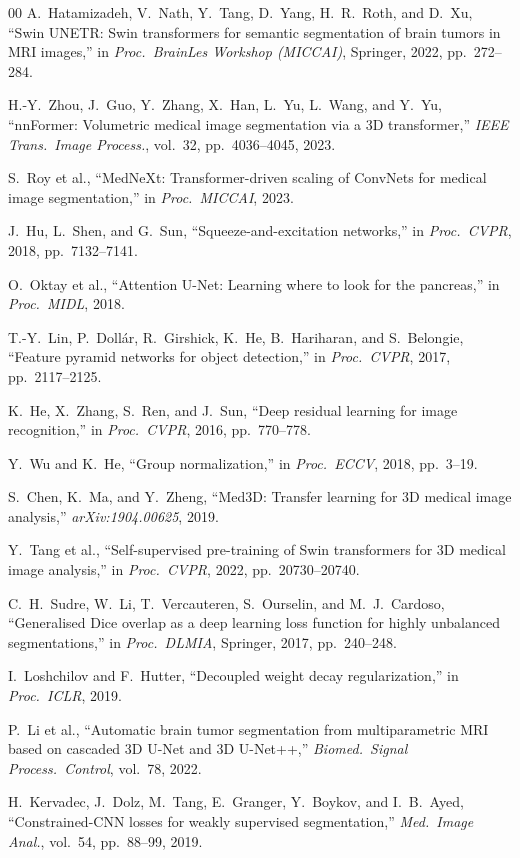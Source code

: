 \documentclass[conference]{IEEEtran}
\begin{document}
\begin{thebibliography}{00}
A.~Hatamizadeh, V.~Nath, Y.~Tang, D.~Yang, H.~R.~Roth, and D.~Xu,
``Swin UNETR: Swin transformers for semantic segmentation of brain
tumors in MRI images,'' in \textit{Proc.\ BrainLes Workshop (MICCAI)},
Springer, 2022, pp.~272--284.

H.-Y.~Zhou, J.~Guo, Y.~Zhang, X.~Han, L.~Yu, L.~Wang, and Y.~Yu,
``nnFormer: Volumetric medical image segmentation via a 3D
transformer,'' \textit{IEEE Trans.\ Image Process.}, vol.~32,
pp.~4036--4045, 2023.

S.~Roy et al., ``MedNeXt: Transformer-driven scaling of ConvNets
for medical image segmentation,'' in \textit{Proc.\ MICCAI}, 2023.

J.~Hu, L.~Shen, and G.~Sun, ``Squeeze-and-excitation networks,''
in \textit{Proc.\ CVPR}, 2018, pp.~7132--7141.

O.~Oktay et al., ``Attention U-Net: Learning where to look for the
pancreas,'' in \textit{Proc.\ MIDL}, 2018.

T.-Y.~Lin, P.~Doll\'{a}r, R.~Girshick, K.~He, B.~Hariharan, and
S.~Belongie, ``Feature pyramid networks for object detection,''
in \textit{Proc.\ CVPR}, 2017, pp.~2117--2125.

K.~He, X.~Zhang, S.~Ren, and J.~Sun, ``Deep residual learning for
image recognition,'' in \textit{Proc.\ CVPR}, 2016,
pp.~770--778.

Y.~Wu and K.~He, ``Group normalization,'' in \textit{Proc.\ ECCV},
2018, pp.~3--19.

S.~Chen, K.~Ma, and Y.~Zheng, ``Med3D: Transfer learning for 3D medical image
analysis,'' \textit{arXiv:1904.00625}, 2019.

Y.~Tang et al., ``Self-supervised pre-training of Swin transformers
for 3D medical image analysis,'' in \textit{Proc.\ CVPR}, 2022,
pp.~20730--20740.

C.~H.~Sudre, W.~Li, T.~Vercauteren, S.~Ourselin, and
M.~J.~Cardoso, ``Generalised Dice overlap as a deep learning loss
function for highly unbalanced segmentations,'' in \textit{Proc.\
DLMIA}, Springer, 2017, pp.~240--248.

I.~Loshchilov and F.~Hutter, ``Decoupled weight decay
regularization,'' in \textit{Proc.\ ICLR}, 2019.

P.~Li et al., ``Automatic brain tumor segmentation from
multiparametric MRI based on cascaded 3D U-Net and 3D U-Net++,''
\textit{Biomed.\ Signal Process.\ Control}, vol.~78, 2022.

H.~Kervadec, J.~Dolz, M.~Tang, E.~Granger, Y.~Boykov, and
I.~B.~Ayed, ``Constrained-CNN losses for weakly supervised
segmentation,'' \textit{Med.\ Image Anal.}, vol.~54,
pp.~88--99, 2019.

\end{thebibliography}
\end{document}
